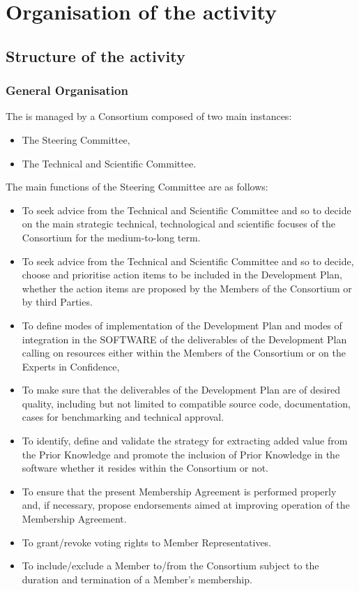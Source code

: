 \chapter{Organisation of the \telemacsystem{} activity}

\section{Structure of the \telemacsystem{} activity}

\subsection{General Organisation}

The \telemacsystem{} is managed by a Consortium composed of two main instances:
\begin{itemize}
\item The Steering Committee,
\item The Technical and Scientific Committee.
\end{itemize}

The main functions of the Steering Committee are as follows:
\begin{itemize}
\item To seek advice from the Technical and Scientific Committee and so to
  decide on the main strategic technical, technological and scientific focuses
  of the Consortium for the medium-to-long term.
\item To seek advice from the Technical and Scientific Committee and so to
  decide, choose and prioritise action items to be included in the Development
  Plan, whether the action items are proposed by the Members of the Consortium
  or by third Parties.
\item To define modes of implementation of the Development Plan and modes of
  integration in the SOFTWARE of the deliverables of the Development Plan
  calling on resources either within the Members of the Consortium or on the
  Experts in Confidence,
\item To make sure that the deliverables of the Development Plan are of desired
  quality, including but not limited to compatible source code, documentation,
  cases for benchmarking and technical approval.
\item To identify, define and validate the strategy for extracting added value
  from the Prior Knowledge and promote the inclusion of Prior Knowledge in the
  software whether it resides within the Consortium or not.
\item To ensure that the present Membership Agreement is performed properly
  and, if necessary, propose endorsements aimed at improving operation of the
  Membership Agreement.
\item To grant/revoke voting rights to Member Representatives.
\item To include/exclude a Member to/from the Consortium subject to the
  duration and termination of a Member's membership.
\end{itemize}

